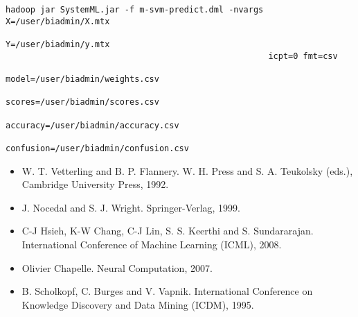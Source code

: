 \begin{verbatim}
hadoop jar SystemML.jar -f m-svm-predict.dml -nvargs X=/user/biadmin/X.mtx 
                                                     Y=/user/biadmin/y.mtx 
                                                     icpt=0 fmt=csv
                                                     model=/user/biadmin/weights.csv
                                                     scores=/user/biadmin/scores.csv
                                                     accuracy=/user/biadmin/accuracy.csv
                                                     confusion=/user/biadmin/confusion.csv
\end{verbatim}


\begin{itemize}
\item W. T. Vetterling and B. P. Flannery.  \newblock W. H. Press and S. A. Teukolsky
(eds.), Cambridge University Press, 1992.
\item J. Nocedal and  S. J. Wright.  \newblock Springer-Verlag, 1999.
\item C-J Hsieh, K-W Chang, C-J Lin, S. S. Keerthi and S. Sundararajan.  \newblock International Conference of Machine Learning
(ICML), 2008.
\item Olivier Chapelle.  \newblock Neural 
Computation, 2007.
\item B. Scholkopf, C. Burges and V. Vapnik.  \newblock International Conference on Knowledge Discovery and Data Mining (ICDM), 1995.
\end{itemize}

